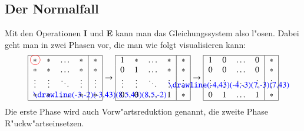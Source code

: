 \subsection{Der Normalfall}
Mit den Operationen {\bf I} und {\bf E} kann man das Gleichungssystem
also l"osen. Dabei geht man in zwei Phasen vor, die man wie folgt
visualisieren kann:
\begin{gather*}
\begin{tabular}{|>{$}c<{$}>{$}c<{$}>{$}c<{$}>{$}c<{$}|>{$}c<{$}|}
\hline
\begin{picture}(0,0)
\color{red}\put(2.7,3.1){\circle{12}}
\end{picture}%
*&*&\dots&*&*\\
*&*&\dots&*&*\\
\vdots& \vdots& \ddots& \vdots&\vdots\\
\begin{picture}(0,0)
\color{blue}\drawline(-3,-2)(-3,43)(8.5,43)(8.5,-2)
\end{picture}%
*&*&\dots&*&*\\
\hline
\end{tabular}
\rightarrow
\begin{tabular}{|>{$}c<{$}>{$}c<{$}>{$}c<{$}>{$}c<{$}|>{$}c<{$}|}
\hline
1&*&\dots&*&*\\
0&1&\dots&*&*\\
\vdots& \vdots& \ddots&\begin{picture}(0,0)
\color{blue}\drawline(-4,43)(-4,-3)(7,-3)(7,43)
\end{picture}%
\vdots&\vdots\\
0&0&\dots&1&*\\
\hline
\end{tabular}
\rightarrow
\begin{tabular}{|>{$}c<{$}>{$}c<{$}>{$}c<{$}>{$}c<{$}|>{$}c<{$}|}
\hline
1&0&\dots&0&*\\
0&0&\dots&0&*\\
\vdots& \vdots& \ddots& \vdots&\vdots\\
0&1&\dots&1&*\\
\hline
\end{tabular}
\end{gather*}
Die erste Phase wird auch Vorw"artsreduktion genannt, die
zweite Phase R"uckw"artseinsetzen.
